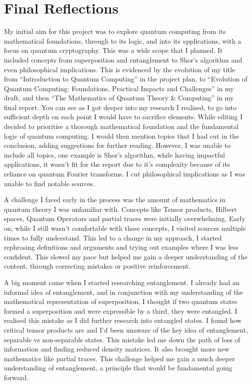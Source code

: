 \chapter*{Final Reflections}

My initial aim for this project was to explore quantum computing from its mathematical foundations, through to its logic, and into its applications, with a focus on quantum cryptography. This was a wide scope that I planned. It included concepts from superposition and entanglement to Shor's algorithm and even philosophical implications. This is evidenced by the evolution of my title from “Introduction to Quantum Computing” in the project plan, to “Evolution of Quantum Computing: Foundations, Practical Impacts and Challenges” in my draft, and then “The Mathematics of Quantum Theory \& Computing” in my final report. You can see as I got deeper into my research I realised, to go into sufficient depth on each point I would have to sacrifice elements. While editing I decided to prioritise a thorough mathematical foundation and the fundamental logic of quantum computing. I would then mention topics that I had cut in the conclusion, adding suggestions for further reading. However, I was unable to include all topics, one example is Shor's algorithm, while having impactful applications, it wasn't fit for the report due to it's complexity because of its reliance on quantum Fourier transforms. I cut philosophical implications as I was unable to find notable sources. 

\noindent A challenge I faced early in the process was the amount of mathematics in quantum theory I was unfamiliar with. Concepts like Tensor products, Hilbert spaces, Quantum Operators and partial traces were initially overwhelming. Early on, while I still wasn't comfortable with these concepts, I visited sources multiple times to fully understand. This led to a change in my approach, I started rephrasing definitions and arguments and trying out examples where I was less confident. This slowed my pace but helped me gain a deeper understanding of the content, through correcting mistakes or positive reinforcement.

\noindent A big moment came when I started researching entanglement. I already had an informal idea of entanglement, and in conjunction with my understanding of the mathematical representation of superposition, I thought if two quantum states formed a superposition and were expressible by a third, they were entangled. I realised this mistake as I did further research into entangled states. I found how critical tensor products are and I'd been unaware of the key idea of entanglement, separable vs non-separable states. This mistake led me down the path of loss of information and finding reduced density matrices. It also brought more new mathematics like partial traces. This challenge helped me gain a much deeper understanding of entanglement, a principle that would be fundamental going forward.

